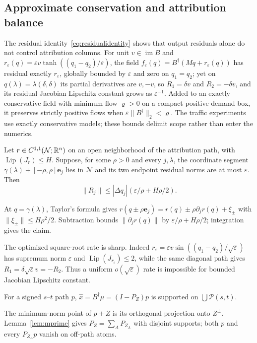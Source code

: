 \subsection{Approximate conservation and attribution balance}\label{app:approx}\label{app:failurestatement}
The residual identity~\eqref{eq:residualidentity} shows that output residuals alone do not control attribution columns. For unit $v\in\operatorname{im}B$ and
$r_\varepsilon(q)=\varepsilon v\tanh((q_1-q_2)/\varepsilon)$, the field $f_\varepsilon(q)=B^\dagger(Mq+r_\varepsilon(q))$ has residual exactly $r_\varepsilon$, globally bounded by $\varepsilon$ and zero on $q_1=q_2$; yet on $q(\lambda)=\lambda(\delta,\delta)$ its partial derivatives are $v,-v$, so $R_1=\delta v$ and $R_2=-\delta v$, and its residual Jacobian Lipschitz constant grows as $\varepsilon^{-1}$. Added to an exactly conservative field with minimum flow $\varrho>0$ on a compact positive-demand box, it preserves strictly positive flows when $\varepsilon\|B^\dagger\|_2<\varrho$. The traffic experiments use exactly conservative models; these bounds delimit scope rather than enter the numerics.

\begin{theorem}\label{thm:t1pmain}
Let $r\in C^{1,1}(\mathcal N;\mathbb{R}^n)$ on an open neighborhood of the attribution path, with $\operatorname{Lip}(J_r)\le H$. Suppose, for some $\rho>0$ and every $j,\lambda$, the coordinate segment $\gamma(\lambda)+[-\rho,\rho]\mathbf e_j$ lies in $\mathcal N$ and its two endpoint residual norms are at most $\varepsilon$. Then
\[
\|R_j\|\le|\Delta q_j|(\varepsilon/\rho+H\rho/2).
\]
\end{theorem}
\begin{pf}
At $q=\gamma(\lambda)$, Taylor's formula gives $r(q\pm\rho\mathbf e_j)=r(q)\pm\rho\partial_jr(q)+\xi_\pm$ with $\|\xi_\pm\|\le H\rho^2/2$. Subtraction bounds $\|\partial_jr(q)\|$ by $\varepsilon/\rho+H\rho/2$; integration gives the claim.
\end{pf}
The optimized square-root rate is sharp. Indeed $r_\varepsilon=\varepsilon v\sin((q_1-q_2)/\sqrt\varepsilon)$ has supremum norm $\varepsilon$ and $\operatorname{Lip}(J_{r_\varepsilon})\le2$, while the same diagonal path gives $R_1=\delta\sqrt\varepsilon v=-R_2$. Thus a uniform $o(\sqrt\varepsilon)$ rate is impossible for bounded Jacobian Lipschitz constant.

\begin{lemma}\label{lem:s}
For a signed $s$--$t$ path $p$, $\hat x=B^\dagger\mu=(I-P_Z)p$
is supported on $\bigcup\mathcal P(s,t)$.
\end{lemma}
\begin{pf}
The minimum-norm point of $p+Z$ is its orthogonal projection onto
$Z^\perp$. Lemma~\ref{lem:mprime} gives
$P_Z=\sum_A P_{Z_A}$ with disjoint supports; both $p$ and every
$P_{Z_A}p$ vanish on off-path atoms.
\end{pf}

